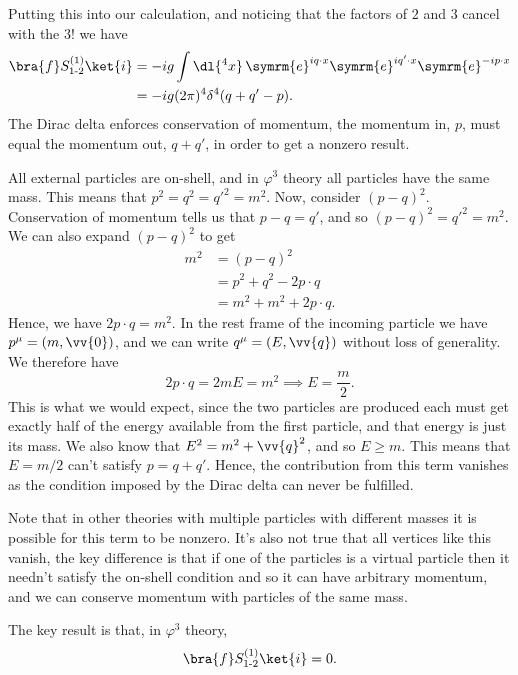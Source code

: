 \documentclass[fleqn]{NotesClass}
\newcommand{\e}{\symrm{e}}
\begin{document}
    Putting this into our calculation, and noticing that the factors of \(2\) and \(3\) cancel with the \(3!\) we have
    \begin{align}
        \bra{f} S^{(1)}_{\text{1-2}} \ket{i} &= -ig \int \dl{^4x} \, \e^{iq\cdot x} \e^{iq'\cdot x} \e^{-ip\cdot x}\\
        &= -ig (2\pi)^4\delta^4(q + q' - p).
    \end{align}
    The Dirac delta enforces conservation of momentum, the momentum in, \(p\), must equal the momentum out, \(q + q'\), in order to get a nonzero result.
    
    All external particles are on-shell, and in \(\varphi^3\) theory all particles have the same mass.
    This means that \(p^2 = q^2 = q'^2 = m^2\).
    Now, consider \((p - q)^2\).
    Conservation of momentum tells us that \(p - q = q'\), and so \((p - q)^2 = q'^2 = m^2\).
    We can also expand \((p - q)^2\) to get
    \begin{align}
        m^2 &= (p - q)^2\\
        &= p^2 + q^2 - 2p\cdot q\\
        &= m^2 + m^2 + 2p\cdot q.
    \end{align}
    Hence, we have \(2p\cdot q = m^2\).
    In the rest frame of the incoming particle we have \(p^\mu = (m, \vv{0})\), and we can write \(q^\mu = (E, \vv{q})\) without loss of generality.
    We therefore have
    \begin{equation}
        2 p \cdot q = 2mE = m^2 \implies E = \frac{m}{2}.
    \end{equation}
    This is what we would expect, since the two particles are produced each must get exactly half of the energy available from the first particle, and that energy is just its mass.
    We also know that \(E^2 = m^2 + \vv{q}^2\), and so \(E \ge m\).
    This means that \(E = m/2\) can't satisfy \(p = q + q'\).
    Hence, the contribution from this term vanishes as the condition imposed by the Dirac delta can never be fulfilled.
    
    Note that in other theories with multiple particles with different masses it is possible for this term to be nonzero.
    It's also not true that all vertices like this vanish, the key difference is that if one of the particles is a virtual particle then it needn't satisfy the on-shell condition and so it can have arbitrary momentum, and we can conserve momentum with particles of the same mass.
    
    The key result is that, in \(\varphi^3\) theory,
    \begin{equation}
        \bra{f} S^{(1)}_{\text{1-2}} \ket{i} = 0.
    \end{equation}
    
\end{document}
